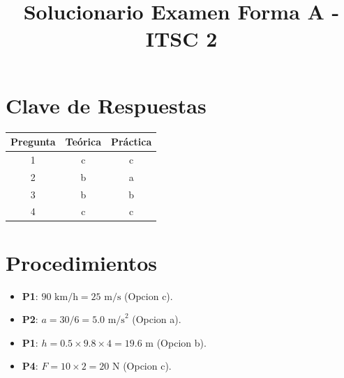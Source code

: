 \documentclass[12pt]{article}
\title{Solucionario Examen Forma A - ITSC 2}
\date{}
\begin{document}
\maketitle

\section*{Clave de Respuestas}

\begin{table}[h]
\centering
\begin{tabular}{|c|c|c|}
\hline
\textbf{Pregunta} & \textbf{Teórica} & \textbf{Práctica} \\ \hline
1 & c & c \\ \hline
2 & b & a \\ \hline
3 & b & b \\ \hline
4 & c & c \\ \hline
\end{tabular}
\end{table}

\section*{Procedimientos}

\begin{itemize}
    \item \textbf{P1}: $90 \text{ km/h} = 25 \text{ m/s}$ (Opcion c).
    \item \textbf{P2}: $a = 30/6 = 5.0 \text{ m/s}^2$ (Opcion a).
    \item \textbf{P1}: $h = 0.5 \times 9.8 \times 4 = 19.6 \text{ m}$ (Opcion b).
    \item \textbf{P4}: $F = 10 \times 2 = 20 \text{ N}$ (Opcion c).
\end{itemize}
\end{document}
